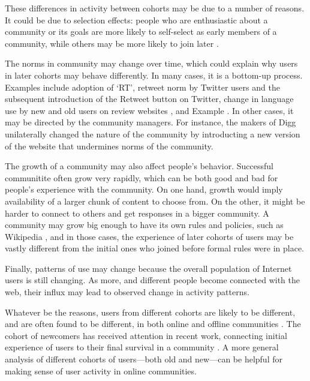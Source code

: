 These differences in activity between cohorts may be due to a number of reasons. It could be due to selection effects: people who are enthusiastic about a community or its goals are more likely to self-select as early members of a community, while others may be more likely to join later \cite{Li2008}. 

The norms in community may change over time, which could explain why users in later cohorts may behave differently. In many cases, it is a bottom-up process. Examples include adoption of `RT', retweet norm by Twitter users and the subsequent introduction of the Retweet button on Twitter, change in language use by new and old users on review websites \cite{}, and  Example . In other cases, it may be directed by the community managers. For instance, the makers of Digg unilaterally changed the nature of the community by introducting a new version of the website that undermines norms of the community. 

The growth of a community may also affect people's behavior. Successful communitite often grow very rapidly, which can be both good and bad for people's experience with the community. On one hand, growth would imply availability of a larger chunk of content to choose from. On the other, it might be harder to connect to others and get responses in a bigger community. A community may grow big enough to have its own rules and policies, such as Wikipedia \cite{}, and in those cases, the experience of later cohorts of users may be vastly different from the initial ones who joined before formal rules were in place. 

Finally, patterns of use may change because the overall population of Internet users is still changing. As more, and different people become connected with the web, their influx may lead to observed change in activity patterns. 

  


Whatever be the reasons, users from different cohorts are likely to be different, and are often found to be different, in both online and offline communities \cite{}. The cohort of newcomers has received attention in recent work, connecting initial experience of users to their final survival in a community \cite{Tan2015,danescu-mizil}. A more general analysis of different cohorts of users---both old and new---can be helpful for making sense of user activity in online communities. 


